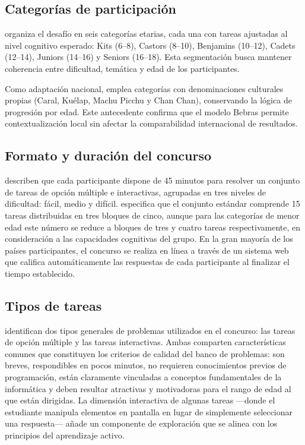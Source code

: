\subsection{Categorías de participación}

\textcite{bebraseeuu} organiza el desafío en seis categorías etarias, cada una con tareas ajustadas al nivel cognitivo esperado: Kits (6--8), Castors (8--10), Benjamins (10--12), Cadets (12--14), Juniors (14--16) y Seniors (16--18). Esta segmentación busca mantener coherencia entre dificultad, temática y edad de los participantes.

Como adaptación nacional, \textcite{bebrasperu} emplea categorías con denominaciones culturales propias (Caral, Kuélap, Machu Picchu y Chan Chan), conservando la lógica de progresión por edad. Este antecedente confirma que el modelo Bebras permite contextualización local sin afectar la comparabilidad internacional de resultados.

\subsection{Formato y duración del concurso}

\textcite{dagienefutschek2008} describen que cada participante dispone de 45 minutos para resolver un conjunto de tareas de opción múltiple e interactivas, agrupadas en tres niveles de dificultad: fácil, medio y difícil. \textcite{bebras} especifica que el conjunto estándar comprende 15 tareas distribuidas en tres bloques de cinco, aunque para las categorías de menor edad este número se reduce a bloques de tres y cuatro tareas respectivamente, en consideración a las capacidades cognitivas del grupo. En la gran mayoría de los países participantes, el concurso se realiza en línea a través de un sistema web que califica automáticamente las respuestas de cada participante al finalizar el tiempo establecido.

\subsection{Tipos de tareas}

\textcite{dagienefutschek2008} identifican dos tipos generales de problemas utilizados en el concurso: las tareas de opción múltiple y las tareas interactivas. Ambas comparten características comunes que constituyen los criterios de calidad del banco de problemas: son breves, respondibles en pocos minutos, no requieren conocimientos previos de programación, están claramente vinculadas a conceptos fundamentales de la informática y deben resultar atractivas y motivadoras para el rango de edad al que están dirigidas. La dimensión interactiva de algunas tareas —donde el estudiante manipula elementos en pantalla en lugar de simplemente seleccionar una respuesta— añade un componente de exploración que se alinea con los principios del aprendizaje activo.

